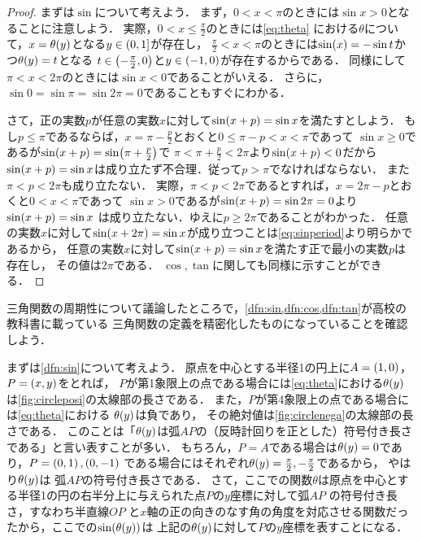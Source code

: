 \documentclass[11pt,a4paper]{ltjsarticle}
\newcommand*{\coord}[1]{\paren{#1}}
\theoremstyle{definition}
\begin{document}
\begin{proof}
  まずは$\sin$について考えよう．
  まず，$0 < x < \pi$のときには$\sin x > 0$となることに注意しよう．
  実際，$0 < x \leq \frac{\pi}{2}$のときには\cref{eq:theta}
  における$\theta$について，$x = \apply{\theta}{y}$となる$y \in \interval{lop}{0,1}$が存在し，
  $\frac{\pi}{2} < x < \pi$のときには$\apply{\sin}{x} = - \sin t$かつ$\apply{\theta}{y} = t$となる
  $t \in \interval{op}{- \frac{\pi}{2}, 0}$と$y \in \interval{op}{-1, 0}$が存在するからである．
  同様にして$\pi < x < 2 \pi$のときには$\sin x < 0$であることがいえる．
  さらに，$\sin 0 = \sin \pi = \sin 2 \pi = 0$であることもすぐにわかる．
  
  さて，正の実数$p$が任意の実数$x$に対して$\apply{\sin}{x + p} = \sin x$を満たすとしよう．
  もし$p \leq \pi$であるならば，$x = \pi - \frac{p}{2}$とおくと$0 \leq \pi - p < x < \pi$であって
  $\sin x \geq 0$であるが$\apply{\sin}{x + p} = \apply{\sin}{\pi + \frac{p}{2}}$で
  $\pi < \pi + \frac{p}{2} < 2 \pi$より$\apply{\sin}{x + p} < 0$だから
  $\apply{\sin}{x + p} = \sin x$は成り立たず不合理．従って$p > \pi$でなければならない．
  また$\pi < p < 2 \pi$も成り立たない．
  実際，$\pi < p < 2 \pi$であるとすれば，$x = 2 \pi - p$とおくと$0 < x < \pi$であって
  $\sin x > 0$であるが$\apply{\sin}{x + p} = \sin 2 \pi = 0$より$\apply{\sin}{x + p} = \sin x$
  は成り立たない．ゆえに$p \geq 2 \pi$であることがわかった．
  任意の実数$x$に対して$\apply{\sin}{x + 2 \pi} = \sin x$が成り立つことは\cref{eq:sinperiod}より明らかであるから，
  任意の実数$x$に対して$\apply{\sin}{x + p} = \sin x$を満たす正で最小の実数$p$は存在し，
  その値は$2 \pi$である．
  $\cos, \tan$に関しても同様に示すことができる．
\end{proof}

三角関数の周期性について議論したところで，\cref{dfn:sin,dfn:cos,dfn:tan}が高校の教科書に載っている
三角関数の定義を精密化したものになっていることを確認しよう．

まずは\cref{dfn:sin}について考えよう．
原点を中心とする半径1の円上に$A = \coord{1,0}$，$P = \coord{x,y}$をとれば，
$P$が第1象限上の点である場合には\cref{eq:theta}における$\apply{\theta}{y}$
は\cref{fig:circleposi}の太線部の長さである．
また，$P$が第4象限上の点である場合には\cref{eq:theta}における
$\apply{\theta}{y}$は負であり，
その絶対値は\cref{fig:circlenega}の太線部の長さである．
このことは「$\apply{\theta}{y}$は弧$AP$の（反時計回りを正とした）符号付き長さである」と言い表すことが多い．
もちろん，$P = A$である場合は$\apply{\theta}{y} = 0$であり，$P = \coord{0, 1}, \coord{0, -1}$
である場合にはそれぞれ$\apply{\theta}{y} = \frac{\pi}{2}, - \frac{\pi}{2}$であるから，
やはり$\apply{\theta}{y}$は
弧$AP$の符号付き長さである．
さて，ここでの関数$\theta$は原点を中心とする半径1の円の右半分上に与えられた点$P$の$y$座標に対して弧$AP$
の符号付き長さ，すなわち半直線$OP$
と$x$軸の正の向きのなす角の角度を対応させる関数だったから，ここでの$\apply{\sin}{\apply{\theta}{y}}$は
上記の$\apply{\theta}{y}$に対して$P$の$y$座標を表すことになる．
\end{document}
